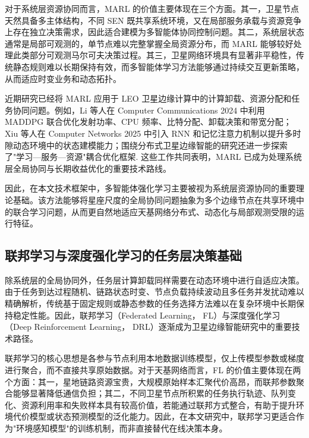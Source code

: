 对于系统层资源协同而言，MARL 的价值主要体现在三个方面。其一，卫星节点天然具备多主体结构，不同 SEN 既共享系统环境，又在局部服务承载与资源竞争上存在独立决策需求，因此适合建模为多智能体协同控制问题。其二，系统层状态通常是局部可观测的，单节点难以完整掌握全局资源分布，而 MARL 能够较好处理此类部分可观测马尔可夫决策过程。其三，卫星网络环境具有显著非平稳性，传统静态规则难以长期保持有效，而多智能体学习方法能够通过持续交互更新策略，从而适应时变业务和动态拓扑\cite{Zhang2024CollaborativeTVT,Li2024MARLComCom,Xiu2025MARATD3}。

近期研究已经将 MARL 应用于 LEO 卫星边缘计算中的计算卸载、资源分配和任务协同问题。例如，Li 等人在 Computer Communications 2024 中利用 MADDPG 联合优化发射功率、CPU 频率、比特分配、卸载决策和带宽分配\cite{Li2024MARLComCom}；Xiu 等人在 Computer Networks 2025 中引入 RNN 和记忆注意力机制以提升多时隙动态环境中的状态建模能力\cite{Xiu2025MARATD3}；围绕分布式卫星边缘智能的研究还进一步探索了"学习—服务—资源"耦合优化框架\cite{Fan2025SEI}. 这些工作共同表明，MARL 已成为处理系统层全局协同与长期收益优化的重要技术路线。

因此，在本文技术框架中，多智能体强化学习主要被视为系统层资源协同的重要理论基础。该方法能够将星座尺度的全局协同问题抽象为多个边缘节点在共享环境中的联合学习问题，从而更自然地适应天基网络分布式、动态化与局部观测受限的运行特征。

\subsection{联邦学习与深度强化学习的任务层决策基础}

除系统层的全局协同外，任务层计算卸载同样需要在动态环境中进行自适应决策。由于任务到达过程随机、链路状态时变、节点负载持续波动且多任务并发扰动难以精确解析，传统基于固定规则或静态参数的任务选择方法难以在复杂环境中长期保持稳定性能。因此，联邦学习（Federated Learning， FL）与深度强化学习（Deep Reinforcement Learning， DRL）逐渐成为卫星边缘智能研究中的重要技术路径\cite{Matthiesen2024FLSatellites,Fan2025SEI,Rao2025DiffusionLyapunov}。

联邦学习的核心思想是各参与节点利用本地数据训练模型，仅上传模型参数或梯度进行聚合，而不直接共享原始数据。对于天基网络而言，FL 的价值主要体现在两个方面：其一，星地链路资源宝贵，大规模原始样本汇聚代价高昂，而联邦参数聚合能够显著降低通信负担；其二，不同卫星节点所积累的任务执行轨迹、队列变化、资源利用率和失败样本具有较高价值，若能通过联邦方式整合，有助于提升环境代价模型或状态预测模型的泛化能力\cite{Matthiesen2024FLSatellites}。因此，在本文研究中，联邦学习更适合作为"环境感知模型"的训练机制，而非直接替代在线决策本身。

